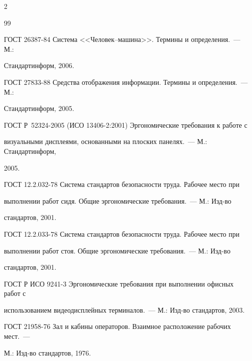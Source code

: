 \begin{multicols}{2}
{{\begin{thebibliography}{99}


ГОСТ 26387-84 Система <<Человек--машина>>. Термины и определения.~--- М.: 


Стандартинформ, 2006.







ГОСТ 27833-88 Средства отображения информации. Термины и определения.~--- М.: 


Стандартинформ, 2005.







ГОСТ Р~52324-2005 (ИСО 13406-2:2001) Эргономические требования к работе с 


визуальными дисплеями, основанными на плоских панелях.~--- М.: Стандартинформ, 


2005.







ГОСТ 12.2.032-78 Система стандартов безопасности труда. Рабочее место при 


выполнении работ сидя. Общие эргономические требования.~--- М.: Изд-во 


стандартов, 2001.







ГОСТ 12.2.033-78 Система стандартов безопасности труда. Рабочее место при 


выполнении работ стоя. Общие эргономические требования.~--- М.: Изд-во 


стандартов, 2001.







ГОСТ Р ИСО 9241-3 Эргономические требования при выполнении офисных работ с 


использованием видеодисплейных терминалов.~--- М.: Изд-во стандартов, 2003.







ГОСТ 21958-76 Зал и кабины операторов. Взаимное расположение рабочих мест.~--- 


М.: Изд-во стандартов, 1976.






\end{thebibliography}}}
\end{multicols}
